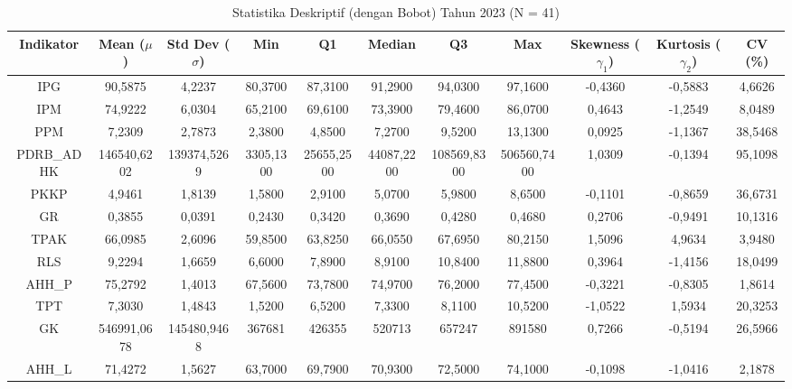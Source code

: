 \begin{table}[H]
\centering
\caption{Statistika Deskriptif (dengan Bobot) Tahun 2023 (N = 41)} \label{tab:app1desc_2023}
\begin{adjustbox}{max width=\textwidth, max height=0.85\textheight}
\begin{tabular}{|c|c|c|c|c|c|c|c|c|c|c|}
\hline
\textbf{Indikator} & \textbf{Mean ($\mu$)} & \textbf{Std Dev ($\sigma$)} & \textbf{Min} & \textbf{Q1} & \textbf{Median} & \textbf{Q3} & \textbf{Max} & \textbf{Skewness ($\gamma_1$)} & \textbf{Kurtosis ($\gamma_2$)} & \textbf{CV (\%)} \\
\hline
IPG & 90,5875 & 4,2237 & 80,3700 & 87,3100 & 91,2900 & 94,0300 & 97,1600 & -0,4360 & -0,5883 & 4,6626 \\
IPM & 74,9222 & 6,0304 & 65,2100 & 69,6100 & 73,3900 & 79,4600 & 86,0700 & 0,4643 & -1,2549 & 8,0489 \\
PPM & 7,2309 & 2,7873 & 2,3800 & 4,8500 & 7,2700 & 9,5200 & 13,1300 & 0,0925 & -1,1367 & 38,5468 \\
PDRB\_ADHK & 146540,6202 & 139374,5269 & 3305,1300 & 25655,2500 & 44087,2200 & 108569,8300 & 506560,7400 & 1,0309 & -0,1394 & 95,1098 \\
PKKP & 4,9461 & 1,8139 & 1,5800 & 2,9100 & 5,0700 & 5,9800 & 8,6500 & -0,1101 & -0,8659 & 36,6731 \\
GR & 0,3855 & 0,0391 & 0,2430 & 0,3420 & 0,3690 & 0,4280 & 0,4680 & 0,2706 & -0,9491 & 10,1316 \\
TPAK & 66,0985 & 2,6096 & 59,8500 & 63,8250 & 66,0550 & 67,6950 & 80,2150 & 1,5096 & 4,9634 & 3,9480 \\
RLS & 9,2294 & 1,6659 & 6,6000 & 7,8900 & 8,9100 & 10,8400 & 11,8800 & 0,3964 & -1,4156 & 18,0499 \\
AHH\_P & 75,2792 & 1,4013 & 67,5600 & 73,7800 & 74,9700 & 76,2000 & 77,4500 & -0,3221 & -0,8305 & 1,8614 \\
TPT & 7,3030 & 1,4843 & 1,5200 & 6,5200 & 7,3300 & 8,1100 & 10,5200 & -1,0522 & 1,5934 & 20,3253 \\
GK & 546991,0678 & 145480,9468 & 367681 & 426355 & 520713 & 657247 & 891580 & 0,7266 & -0,5194 & 26,5966 \\
AHH\_L & 71,4272 & 1,5627 & 63,7000 & 69,7900 & 70,9300 & 72,5000 & 74,1000 & -0,1098 & -1,0416 & 2,1878 \\
\hline
\end{tabular}
\end{adjustbox}
\end{table}